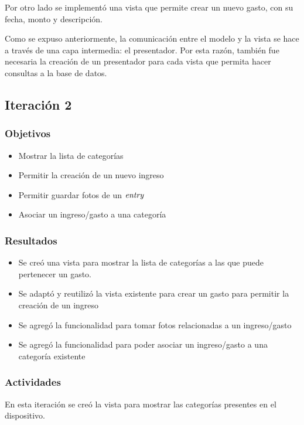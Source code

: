 Por otro lado se implementó una vista que permite crear un nuevo gasto, con su fecha, monto y descripción.

Como se expuso anteriormente, la comunicación entre el modelo y la vista se hace a través de una capa intermedia: el presentador. Por esta razón, también fue necesaria la creación de un presentador para cada vista que permita hacer consultas a la base de datos.

\subsection{Iteración 2}

\subsubsection{Objetivos}
\begin{itemize}
\item Mostrar la lista de categorías
\item Permitir la creación de un nuevo ingreso
\item Permitir guardar fotos de un $\textit{entry}$
\item Asociar un ingreso/gasto a una categoría
\end{itemize}

\subsubsection{Resultados}
\begin{itemize}
\item Se creó una vista para mostrar la lista de categorías a las que puede pertenecer un gasto.
\item Se adaptó y reutilizó la vista existente para crear un gasto para permitir la creación de un ingreso
\item Se agregó la funcionalidad para tomar fotos relacionadas a un ingreso/gasto
\item Se agregó la funcionalidad para poder asociar un ingreso/gasto a una categoría existente

\end{itemize}

\subsubsection{Actividades}

En esta iteración se creó la vista para mostrar las categorías presentes en el dispositivo.


